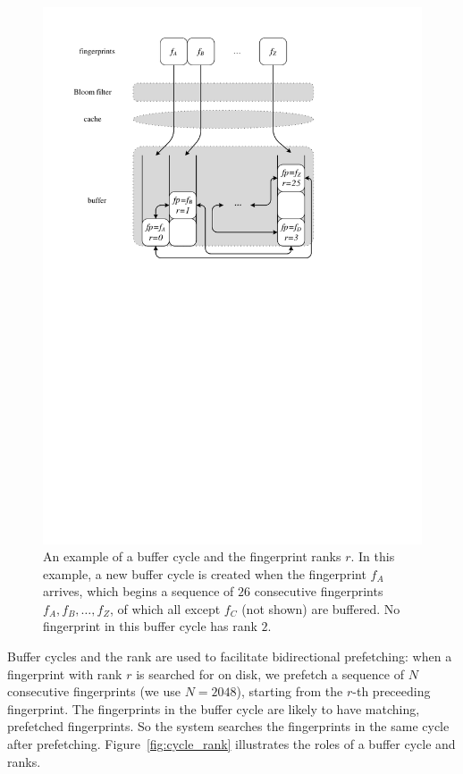 \documentclass[prodmode,acmtecs]{acmsmall}
\begin{document}
\begin{figure}[htbp]
  \begin{center}
  \includegraphics[width=0.6\columnwidth]{list-buffer}
  \end{center}
  \caption{An example of a buffer cycle and the fingerprint ranks $r$.  In this example, a new buffer cycle is created when the fingerprint $f_A$ arrives, which begins a sequence of $26$ consecutive fingerprints $f_A,f_B,\ldots,f_Z$, of which all except $f_C$ (not shown) are buffered.  No fingerprint in this buffer cycle has rank $2$.}
  \label{fig:list-buffer}
\end{figure}

Buffer cycles and the rank are used to facilitate bidirectional prefetching: when a fingerprint with rank $r$ is searched for on disk, we prefetch a sequence of $N$ consecutive fingerprints (we use $N=2048$), starting from the $r$-th preceeding fingerprint.  The fingerprints in the buffer cycle are likely to have matching, prefetched fingerprints. So the system searches the fingerprints in the same cycle after prefetching.  Figure~\ref{fig:cycle_rank} illustrates the roles of a buffer cycle and ranks.
\end{document}

